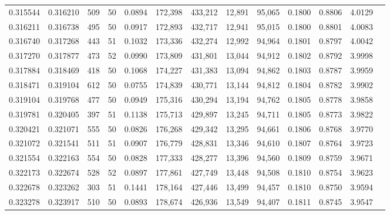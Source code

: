 \begin{tabular}{rrrrrrrrrrrrr}
0.315544 & 0.316210 &   509 &  50 &                                     0.0894 & 172,398 & 433,212 &  12,891 &  95,065 & 0.1800 & 0.8806 & 4.0129 \\
0.316211 & 0.316738 &   495 &  50 &                                     0.0917 & 172,893 & 432,717 &  12,941 &  95,015 & 0.1800 & 0.8801 & 4.0083 \\
0.316740 & 0.317268 &   443 &  51 &                                     0.1032 & 173,336 & 432,274 &  12,992 &  94,964 & 0.1801 & 0.8797 & 4.0042 \\
0.317270 & 0.317877 &   473 &  52 &                                     0.0990 & 173,809 & 431,801 &  13,044 &  94,912 & 0.1802 & 0.8792 & 3.9998 \\
0.317884 & 0.318469 &   418 &  50 &                                     0.1068 & 174,227 & 431,383 &  13,094 &  94,862 & 0.1803 & 0.8787 & 3.9959 \\
0.318471 & 0.319104 &   612 &  50 &                                     0.0755 & 174,839 & 430,771 &  13,144 &  94,812 & 0.1804 & 0.8782 & 3.9902 \\
0.319104 & 0.319768 &   477 &  50 &                                     0.0949 & 175,316 & 430,294 &  13,194 &  94,762 & 0.1805 & 0.8778 & 3.9858 \\
0.319781 & 0.320405 &   397 &  51 &                                     0.1138 & 175,713 & 429,897 &  13,245 &  94,711 & 0.1805 & 0.8773 & 3.9822 \\
0.320421 & 0.321071 &   555 &  50 &                                     0.0826 & 176,268 & 429,342 &  13,295 &  94,661 & 0.1806 & 0.8768 & 3.9770 \\
0.321072 & 0.321541 &   511 &  51 &                                     0.0907 & 176,779 & 428,831 &  13,346 &  94,610 & 0.1807 & 0.8764 & 3.9723 \\
0.321554 & 0.322163 &   554 &  50 &                                     0.0828 & 177,333 & 428,277 &  13,396 &  94,560 & 0.1809 & 0.8759 & 3.9671 \\
0.322173 & 0.322674 &   528 &  52 &                                     0.0897 & 177,861 & 427,749 &  13,448 &  94,508 & 0.1810 & 0.8754 & 3.9623 \\
0.322678 & 0.323262 &   303 &  51 &                                     0.1441 & 178,164 & 427,446 &  13,499 &  94,457 & 0.1810 & 0.8750 & 3.9594 \\
0.323278 & 0.323917 &   510 &  50 &                                     0.0893 & 178,674 & 426,936 &  13,549 &  94,407 & 0.1811 & 0.8745 & 3.9547 \\

\end{tabular}
